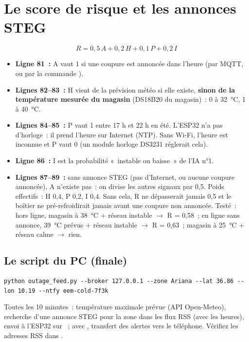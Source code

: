 \section{Le score de risque et les annonces STEG}\label{sec:risque}
\[ R = 0{,}5\,A + 0{,}2\,H + 0{,}1\,P + 0{,}2\,I \]

\begin{itemize}
  \item \textbf{Ligne 81~:} A vaut 1 si une coupure est annoncée dans l'heure (par MQTT, ou par la commande ).
  \item \textbf{Lignes 82--83~:} H vient de la prévision météo si elle existe, \textbf{sinon de la température mesurée du magasin} (DS18B20 du magasin)~: 0 à 32~°C, 1 à 40~°C.
  \item \textbf{Lignes 84--85~:} P vaut 1 entre 17 h et 22 h en été. L'ESP32 n'a pas d'horloge~: il prend l'heure sur Internet (NTP). Sans Wi-Fi, l'heure est inconnue et P vaut 0 (un module horloge DS3231 réglerait cela).
  \item \textbf{Ligne 86~:} I est la probabilité «~instable ou baisse~» de l'IA n°1.
  \item \textbf{Lignes 87--89~:} sans annonce STEG (pas d'Internet, ou aucune coupure annoncée), A n'existe pas~: on divise les autres signaux par 0,5. Poids effectifs~: H 0,4, P 0,2, I 0,4. Sans cela, R ne dépasserait jamais 0,5 et le boîtier ne pré-refroidirait jamais avant une coupure non annoncée. Testé~: hors ligne, magasin à 38~°C + réseau instable $\rightarrow$ R = 0,58~; en ligne sans annonce, 39~°C prévus + réseau instable $\rightarrow$ R = 0,63~; magasin à 25~°C + réseau calme $\rightarrow$ rien.
\end{itemize}

\subsection{Le script du PC (finale)}
\begin{lstlisting}[style=cmd]
python outage_feed.py --broker 127.0.0.1 --zone Ariana --lat 36.86 --lon 10.19 --ntfy eem-cold-7f3k
\end{lstlisting}
Toutes les 10 minutes~: température maximale prévue (API Open-Meteo), recherche d'une annonce STEG pour la zone dans les flux RSS (avec les heures), envoi à l'ESP32 sur ~; avec , transfert des alertes vers le téléphone. Vérifiez les adresses RSS dans .

